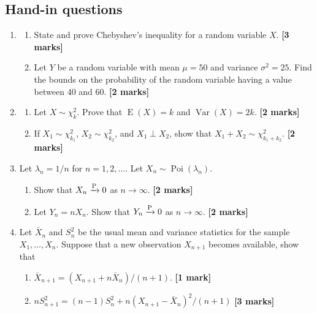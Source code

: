\documentclass[
]{book}
\DeclareMathOperator{\E}{E}
\DeclareMathOperator{\Var}{Var}
\DeclareMathOperator{\Pois}{Poi}
\theoremstyle{definition}
\theoremstyle{definition}
\theoremstyle{definition}
\theoremstyle{definition}
\theoremstyle{remark}
\begin{document}
\hypertarget{hand-in-questions-2}{%
\subsection*{Hand-in questions}\label{hand-in-questions-2}}

\begin{enumerate}
\def\labelenumi{\arabic{enumi}.}
\item
  \begin{enumerate}
  \def\labelenumii{(\alph{enumii})}
  \item
    State and prove Chebyshev's inequality for a random variable \(X\). \textbf{{[}3 marks{]}}
  \item
    Let \(Y\) be a random variable with mean \(\mu = 50\) and variance \(\sigma^2=25\). Find the bounds on the probability of the random variable having a value between 40 and 60. \textbf{{[}2 marks{]}}
  \end{enumerate}
\item
  \begin{enumerate}
  \def\labelenumii{(\alph{enumii})}
  \item
    Let \(X\sim\chi^2_k\). Prove that \(\E(X) = k\) and \(\Var(X)=2k\). \textbf{{[}2 marks{]}}
  \item
    If \(X_1\sim\chi^2_{k_1}\), \(X_2\sim\chi^2_{k_2}\), and \(X_1 \perp X_2\), show that \(X_1+X_2 \sim \chi^2_{k_1+k_2}\). \textbf{{[}2 marks{]}}
  \end{enumerate}
\item
  Let \(\lambda_n=1/n\) for \(n=1,2,\dots\). Let \(X_n\sim\Pois(\lambda_n)\).

  \begin{enumerate}
  \def\labelenumii{(\alph{enumii})}
  \item
    Show that \(X_n\xrightarrow{\text P}0\) as \(n\to\infty\). \textbf{{[}2 marks{]}}
  \item
    Let \(Y_n=nX_n\). Show that \(Y_n\xrightarrow{\text P}0\) as \(n\to\infty\). \textbf{{[}2 marks{]}}
  \end{enumerate}
\item
  Let \(\bar X_n\) and \(S_n^2\) be the usual mean and variance statistics for the sample \(X_1,\dots,X_n\). Suppose that a new observation \(X_{n+1}\) becomes available, show that

  \begin{enumerate}
  \def\labelenumii{(\alph{enumii})}
  \item
    \(\bar X_{n+1}=(X_{n+1} + n\bar X_n) / (n+1)\). \textbf{{[}1 mark{]}}
  \item
    \(nS_{n+1}^2=(n-1)S_n^2 + n(X_{n+1}-\bar X_n)^2 / (n+1)\) \textbf{{[}3 marks{]}}
  \end{enumerate}
\end{enumerate}
\end{document}
